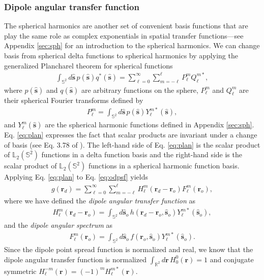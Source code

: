 \documentclass[]{osa-article}
\providecommand{\mb}[1]{\mathbf{#1}}
\providecommand{\ro}{\mathbf{\mathbf{r}}_o}
\providecommand{\so}{\mathbf{\hat{s}}_o}
\providecommand{\rd}{\mathbf{r}_d}
\providecommand{\mh}[1]{\mathbf{\hat{#1}}}
\providecommand{\mbb}[1]{\mathbb{#1}}
\providecommand{\lmsum}{\sum_{\ell=0}^\infty\sum_{m=-\ell}^{\ell}}
\providecommand{\ints}[1]{\int_{\mbb{S}^{#1}}}
\begin{document}
\subsubsection{Dipole angular transfer function}
The spherical harmonics are another set of convenient basis functions that are
play the same role as complex exponentials in spatial transfer functions---see
Appendix \ref{sec:sph} for an introduction to the spherical harmonics. We can
change basis from spherical delta functions to spherical harmonics by applying
the generalized Plancharel theorem for spherical functions
\begin{align}
  \ints{2}d\mh{s}\, p(\mh{s})q^*(\mh{s}) = \lmsum P_\ell^m Q_\ell^{m*}, \label{eq:plan}
\end{align}
where $p(\mh{s})$ and $q(\mh{s})$ are arbitrary functions on the sphere,
$P_\ell^m$ and $Q_\ell^m$ are their spherical Fourier transforms defined by
\begin{align}
  P_\ell^m = \int_{\mbb{S}^2}d\mh{s}\, p(\mh{s})Y_\ell^{m*}(\mh{s}),
\end{align}
and $Y_{\ell}^m(\mh{s})$ are the spherical harmonic functions defined in
Appendix \ref{sec:sph}. Eq. \ref{eq:plan} expresses the fact that scalar
products are invariant under a change of basis (see Eq. 3.78 of
\cite{barrett2004}). The left-hand side of Eq. \ref{eq:plan} is the scalar
product of $\mbb{L}_2(\mbb{S}^2)$ functions in a delta function basis and the
right-hand side is the scalar product of $\mbb{L}_2(\mbb{S}^2)$ functions in a
spherical harmonic function basis. Applying Eq. \ref{eq:plan} to Eq.
\ref{eq:odpsf} yields
\begin{align}
  g(\rd) = \lmsum H_\ell^m(\rd - \ro)F_\ell^m(\ro), \label{eq:atf-form}
\end{align}
where we have defined the \textit{dipole angular transfer function} as
\begin{align}
  H_\ell^m(\rd - \ro) = \int_{\mbb{S}^2}d\so\, h(\rd - \ro, \so)Y_{\ell}^{m*}(\so),\label{eq:atf-prep} 
\end{align}
and the \textit{dipole angular spectrum} as
\begin{align}
  F_\ell^m(\ro) = \int_{\mbb{S}^2}d\so\, f(\ro, \so)Y_{\ell}^{m*}(\so).
\end{align}
Since the dipole point spread function is normalized and real, we know
that the dipole angular transfer function is normalized
$\int_{\mbb{R}^2}d\mb{r}\, H_0^0(\mb{r}) = 1$ and conjugate symmetric
$H_\ell^{-m}(\mb{r}) = (-1)^mH_\ell^{m*}(\mb{r})$.
\end{document}
